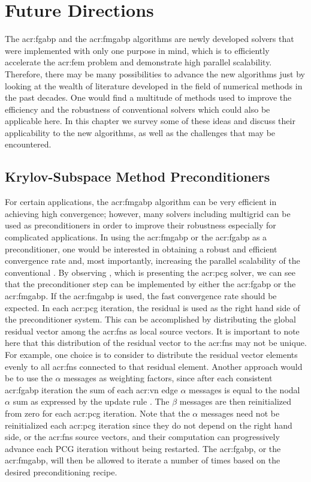 \graphicspath{{figs/Chp-Fut/}}
\chapter{Future Directions}
\label{chp:FD}

The \gls{acr:fgabp} and the \gls{acr:fmgabp} algorithms are newly developed solvers that were implemented with only one purpose in mind, which is to efficiently accelerate the \gls{acr:fem} problem and demonstrate high parallel scalability.
Therefore, there may be many possibilities to advance the new algorithms just by looking at the wealth of literature developed in the field of numerical methods in the past decades.
One would find a multitude of methods used to improve the efficiency and the robustness of conventional solvers which could also be applicable here.
In this chapter we survey some of these ideas and discuss their applicability to the new algorithms, as well as the challenges that may be encountered.


\section{Krylov-Subspace Method Preconditioners}

For certain applications, the \gls{acr:fmgabp} algorithm can be very efficient in achieving high convergence; however, many solvers including multigrid can be used as preconditioners in order to improve their robustness especially for complicated applications.
In using the \gls{acr:fmgabp} or the \gls{acr:fgabp} as a preconditioner, one would be interested in obtaining a robust and efficient convergence rate and, most importantly, increasing the parallel scalability of the conventional .
By observing , which is presenting the \gls{acr:pcg} solver, we can see that the preconditioner step can be implemented by either the \gls{acr:fgabp} or the \gls{acr:fmgabp}.
If the \gls{acr:fmgabp} is used, the fast convergence rate should be expected.
In each \gls{acr:pcg} iteration, the residual is used as the right hand side of the preconditioner system.
This can be accomplished by distributing the global residual vector among the \glspl{acr:fn} as local source vectors.
It is important to note here that this distribution of the residual vector to the \glspl{acr:fn} may not be unique.
For example, one choice is to consider to distribute the residual vector elements evenly to all \glspl{acr:fn} connected to that residual element.
Another approach would be to use the $\alpha$ messages as weighting factors, since after each consistent \gls{acr:fgabp} iteration the sum of each \gls{acr:vn} edge $\alpha$ messages is equal to the nodal $\alpha$ sum as expressed by the update rule .
The $\beta$ messages are then reinitialized from zero for each \gls{acr:pcg} iteration.
Note that the $\alpha$ messages need not be reinitialized each \gls{acr:pcg} iteration since they do not depend on the right hand side, or the \glspl{acr:fn} source vectors, and their computation can progressively advance each PCG iteration without being restarted.
The \gls{acr:fgabp}, or the \gls{acr:fmgabp}, will then be allowed to iterate a number of times based on the desired preconditioning recipe.



